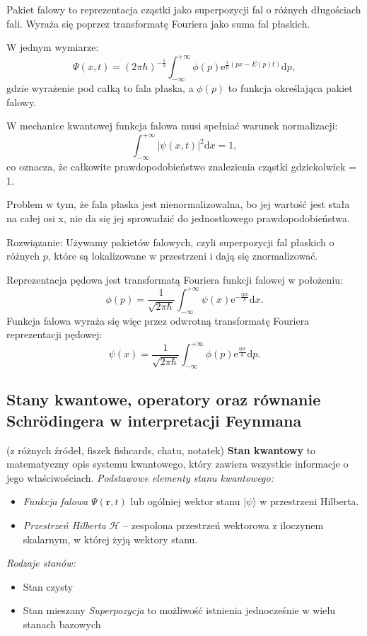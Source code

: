 Pakiet falowy to reprezentacja cząstki jako superpozycji fal o różnych długościach fali. Wyraża się poprzez transformatę Fouriera jako suma fal płaskich.

W jednym wymiarze:
$$\Psi(x,t) = (2 \pi \hbar)^{-\frac12} \int_{-\infty}^{+\infty} \phi(p) \mathrm{e}^{\frac{i}{\hbar}\left(p x - E(p)t \right)} \mathrm{d}p,$$
gdzie wyrażenie pod całką to fala płaska, a $\phi(p)$ to funkcja określająca pakiet falowy.

W mechanice kwantowej funkcja falowa musi spełniać warunek normalizacji:
$$\int_{-\infty}^{+\infty} |\psi(x,t)|^2 \mathrm{d}x = 1,$$
co oznacza, że całkowite prawdopodobieństwo znalezienia cząstki gdziekolwiek = 1. 

Problem w tym, że fala płaska jest nienormalizowalna, bo jej wartość jest stała na całej osi x, nie da się jej sprowadzić do jednostkowego prawdopodobieństwa.

Rozwiązanie: Używamy pakietów falowych, czyli superpozycji fal płaskich o różnych $p$, które są lokalizowane w przestrzeni i dają się znormalizować.

Reprezentacja pędowa jest transformatą Fouriera funkcji falowej w położeniu:
$$\phi(p) = \frac{1}{\sqrt{2\pi \hbar}} \int_{-\infty}^{+\infty} \psi(x) \mathrm{e}^{-\frac{ipx}{\hbar}} \mathrm{d} x.$$
Funkcja falowa wyraża się więc przez odwrotną transformatę Fouriera reprezentacji pędowej:
$$\psi(x) = \frac{1}{\sqrt{2\pi \hbar}} \int_{-\infty}^{+\infty} \phi(p) \mathrm{e}^{\frac{ipx}{\hbar}} \mathrm{d} p.$$

\subsection{Stany kwantowe, operatory oraz równanie Schrödingera w interpretacji Feynmana}
(z różnych źródeł, fiszek fishcards, chatu, notatek)
\textbf{Stan kwantowy} to matematyczny opis systemu kwantowego, który zawiera wszystkie informacje o jego właściwościach.  
\textit{Podstawowe elementy stanu kwantowego:}
\begin{itemize}
  \item \textit{Funkcja falowa} \(\Psi(\mathbf{r},t)\) lub ogólniej wektor stanu \(\lvert \psi \rangle\) w przestrzeni Hilberta.
  \item \textit{Przestrzeń Hilberta} \(\mathcal{H}\) – zespolona przestrzeń wektorowa z iloczynem skalarnym, w której żyją wektory stanu.
 \end{itemize}
\textit{Rodzaje stanów:}
\begin{itemize}
  \item{Stan czysty} 
  \item{Stan mieszany} 
  \textit{Superpozycja} to możliwość istnienia jednocześnie w wielu stanach bazowych 
 \end{itemize}
  
